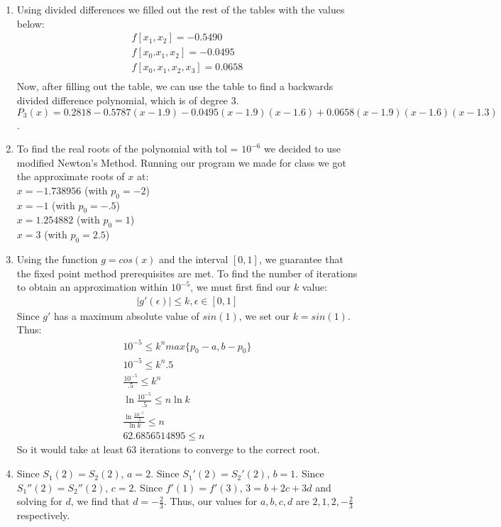 \documentclass[12pt,letterpaper]{article}
\begin{document}
\begin{enumerate}
    \item
    Using divided differences we filled out the rest of the tables with the values below:
    \begin{gather}
        f[x_1, x_2] = -0.5490\\
        f[x_0.x_1,x_2] = -0.0495\\
        f[x_0,x_1,x_2,x_3] = 0.0658\\
    \end{gather}
    Now, after filling out the table, we can use the table to find a backwards divided difference polynomial, which is of degree 3. $P_3(x) = 0.2818 - 0.5787(x-1.9) - 0.0495(x-1.9)(x-1.6) + 0.0658(x-1.9)(x-1.6)(x-1.3)$.  
    
    \item
    To find the real roots of the polynomial with tol = $10^{-6}$ we decided to use modified Newton's Method. Running our program we made for class we got the approximate roots of $x$ at:\\
    $x = -1.738956$ (with $p_0 = -2$)\\
    $x = -1$ (with $p_0 = -.5$)\\
    $x = 1.254882$ (with $p_0  = 1$)\\
    $x = 3$ (with $p_0 = 2.5$)
    
    \item
    Using the function $g = cos(x)$ and the interval $[0, 1]$, we guarantee that the fixed point method prerequisites are met. To find the number of iterations to obtain an approximation within $10^{-5}$, we must first find our $k$ value: 
    \begin{gather}
        |g'(\epsilon)|\leq k, \epsilon \in [0, 1]
    \end{gather}
    Since $g'$ has a maximum absolute value of $sin(1)$, we set our $k = sin(1)$. Thus: 
    \begin{gather}
        10^{-5} \leq k^n max\{p_0-a, b-p_0\}\\
        10^{-5} \leq k^n .5\\
        \frac{10^{-5}}{.5} \leq k^n\\
        \ln{\frac{10^{-5}}{.5}} \leq n\ln{k}\\
        \frac{\ln{\frac{10^{-5}}{.5}}}{\ln{k}} \leq n\\
        62.6856514895 \leq n
    \end{gather}
    So it would take at least $63$ iterations to converge to the correct root.
    
    \item
    Since $S_1(2) = S_2(2)$, $a = 2$. Since $S_1'(2) = S_2'(2)$, $b = 1$. Since $S_1''(2) = S_2''(2)$, $c = 2$. Since 
    $f'(1) = f'(3)$, $3 = b + 2c + 3d$ and solving for $d$, we find that $d = -\frac{2}{3}$. Thus, our values for $a, b, c, d$ are $2, 1, 2, -\frac{2}{3}$ respectively. 
    

\end{enumerate}
\end{document}
